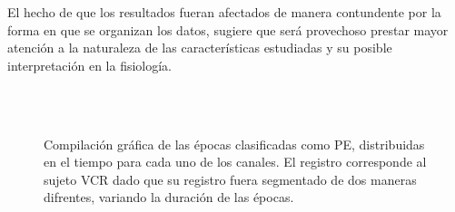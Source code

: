 \documentclass[12pt,a4paper]{mitthesis}
\begin{document}
El hecho de que los resultados fueran afectados de manera contundente por la forma en que se 
organizan los datos, sugiere que ser\'a provechoso prestar mayor atenci\'on a la naturaleza de las 
caracter\'isticas estudiadas y su posible interpretaci\'on en la fisiolog\'ia.


\begin{figure}
\centering
{}\\
\\
\caption{Compilaci\'on gr\'afica de las \'epocas clasificadas como PE, distribuidas en el tiempo
para cada uno de los canales. El registro corresponde al sujeto VCR dado que su registro fuera
segmentado de dos maneras difrentes, variando la duraci\'on de las \'epocas.}
\label{comp_VCR}
\end{figure}
\end{document}
